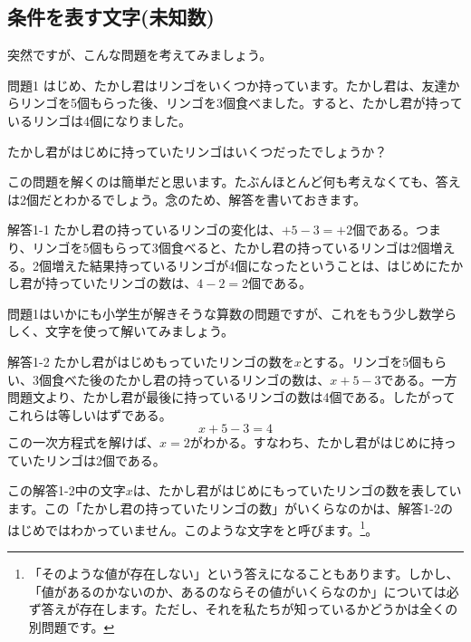 \documentclass[uplatex,dvipdfmx]{jsarticle}
\begin{document}
	\subsection{条件を表す文字(未知数)}
	突然ですが、こんな問題を考えてみましょう。
	
	\begin{itembox}[l]{問題1}
		はじめ、たかし君はリンゴをいくつか持っています。たかし君は、友達からリンゴを5個もらった後、リンゴを3個食べました。すると、たかし君が持っているリンゴは4個になりました。
		
		たかし君がはじめに持っていたリンゴはいくつだったでしょうか？
	\end{itembox}

	この問題を解くのは簡単だと思います。たぶんほとんど何も考えなくても、答えは2個だとわかるでしょう。念のため、解答を書いておきます。
	
	\begin{itembox}[l]{解答1-1}
		たかし君の持っているリンゴの変化は、$+5-3 = +2$個である。つまり、リンゴを5個もらって3個食べると、たかし君の持っているリンゴは2個増える。2個増えた結果持っているリンゴが4個になったということは、はじめにたかし君が持っていたリンゴの数は、$4-2 = 2$個である。
	\end{itembox}
	
	問題1はいかにも小学生が解きそうな算数の問題ですが、これをもう少し数学らしく、文字を使って解いてみましょう。
	
	\begin{itembox}[l]{解答1-2}
		たかし君がはじめもっていたリンゴの数を$x$とする。リンゴを5個もらい、3個食べた後のたかし君の持っているリンゴの数は、$x+5-3$である。一方問題文より、たかし君が最後に持っているリンゴの数は4個である。したがってこれらは等しいはずである。
		\begin{equation}
			x+5-3=4 \label{eq:takasi}
		\end{equation}
		この一次方程式を解けば、$x=2$がわかる。すなわち、たかし君がはじめに持っていたリンゴは2個である。
	\end{itembox}
	
	この解答1-2中の文字$x$は、たかし君がはじめにもっていたリンゴの数を表しています。この「たかし君の持っていたリンゴの数」がいくらなのかは、解答1-2のはじめではわかっていません。このような文字をと呼びます。\footnote{「そのような値が存在しない」という答えになることもあります。しかし、「値があるのかないのか、あるのならその値がいくらなのか」については必ず答えが存在します。ただし、それを私たちが知っているかどうかは全くの別問題です。}。
	
\end{document}
